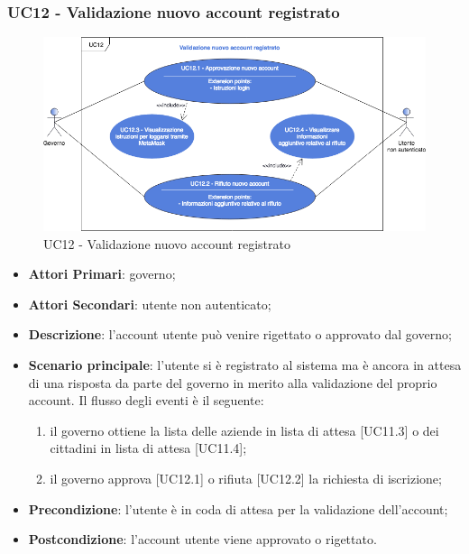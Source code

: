 \subsubsection{UC12 - Validazione nuovo account registrato}
\begin{figure}[h]
	\includegraphics[width=15.5cm]{res/images/UC12Validazione.png} %
	\centering
	\caption{UC12 - Validazione nuovo account registrato}
	
\end{figure}
\begin{itemize}
	\item \textbf{Attori Primari}:
	governo;
	\item \textbf{Attori Secondari}:
	utente non autenticato;
	\item \textbf{Descrizione}: l'account utente può venire rigettato o approvato dal governo;
	\item \textbf{Scenario principale}: l'utente si è registrato al sistema ma è ancora in attesa di una risposta da parte del governo in merito alla validazione del proprio account. Il flusso degli eventi è il seguente:
	\begin{enumerate}[label=\alph*.]
		\item il governo ottiene la lista delle aziende in lista di attesa [UC11.3] o dei cittadini in lista di attesa [UC11.4];
		\item il governo approva [UC12.1] o rifiuta [UC12.2] la richiesta di iscrizione;
	\end{enumerate}
	\item \textbf{Precondizione}: l'utente è in coda di attesa per la validazione dell'account;
	\item \textbf{Postcondizione}: l'account utente viene approvato o rigettato. 
\end{itemize}

